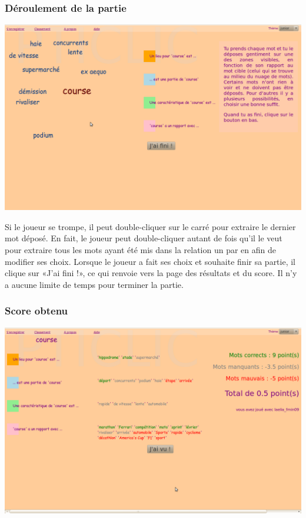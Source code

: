 \documentclass[a4paper,11pt,french]{article}
\begin{document}
\subsubsection{Déroulement de la partie}
\begin{center}
\includegraphics[width=14cm]{img/PtiClicJeu2.png}
\end{center}

Si le joueur se trompe, il peut double-cliquer sur le carré pour extraire le dernier mot déposé. En fait, le joueur peut double-cliquer
autant de fois qu'il le veut pour extraire tous les mots ayant été mis dans la relation un par en afin de modifier ses choix. Lorsque le
joueur a fait ses choix et souhaite finir sa partie, il clique sur «J'ai fini !», ce qui renvoie vers la page des résultats et du score. Il
n'y a aucune limite de temps pour terminer la partie.

\subsubsection{Score obtenu}
\begin{center}
\includegraphics[width=14cm]{img/PtiClicResultats.png}
\end{center}
\end{document}
